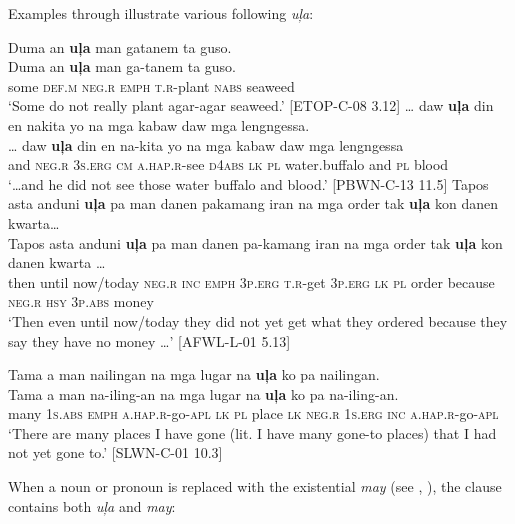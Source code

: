 Examples  through  illustrate various  following \textit{uļa}:

\ea
\label{bkm:Ref80941234}
Duma  an  \textbf{uļa}  man  gatanem  ta  guso. \\\smallskip
\gll Duma  an  \textbf{uļa}  man  ga-tanem  ta  guso. \\
some  \textsc{def.m}  \textsc{neg.r}  \textsc{emph}  \textsc{t.r}-plant  \textsc{nabs}  seaweed \\
\glt ‘Some do not really plant agar-agar seaweed.’ [ETOP-C-08 3.12]
\z
\ea
… daw  \textbf{uļa}  din  en  nakita  yo  na  mga  kabaw daw  mga  lengngessa. \\\smallskip
\gll … daw  \textbf{uļa}  din  en  na-kita  yo  na  mga  kabaw daw  mga  lengngessa \\
{} and  \textsc{neg.r}  3\textsc{s.erg}  \textsc{cm}  \textsc{a.hap.r}-see  \textsc{d4abs}  \textsc{lk}  \textsc{pl}  water.buffalo
and  \textsc{pl}  blood \\
\glt ‘…and he did not see those water buffalo and blood.’ [PBWN-C-13 11.5]
\z
\ea
Tapos  asta  anduni  \textbf{uļa}  pa  man  danen  pakamang  iran  na  mga  order tak  \textbf{uļa}  kon  danen   kwarta… \\\smallskip
\gll Tapos  asta  anduni  \textbf{uļa}  pa  man  danen  pa-kamang  iran  na  mga  order tak  \textbf{uļa}  kon  danen   kwarta … \\
then  until  now/today  \textsc{neg.r}  \textsc{inc}  \textsc{emph}  3\textsc{p.erg}  \textsc{t.r}-get  3\textsc{p.erg}  \textsc{lk}  \textsc{pl}  order
because  \textsc{neg.r}  \textsc{hsy}  3\textsc{p.abs}  money \\
\glt ‘Then even until now/today they did not yet get what they ordered because they say they have no money …’ [AFWL-L-01 5.13]
\z

\ea
Tama  a  man  nailingan  na  mga  lugar  na  \textbf{uļa}  ko  pa nailingan. \\\smallskip
\gll Tama  a  man  na-iling-an  na  mga  lugar  na  \textbf{uļa}  ko  pa na-iling-an. \\
many 1\textsc{s.abs}  \textsc{emph}  \textsc{a.hap.r}-go-\textsc{apl}  \textsc{lk}  \textsc{pl}  place  \textsc{lk}  \textsc{neg.r} 1\textsc{s.erg}  \textsc{inc} \textsc{a.hap.r-}go\textsc{-apl} \\
\glt ‘There are many places I have gone (lit. I have many gone-to places) that I had not yet gone to.’ [SLWN-C-01 10.3]
\z


When a noun or pronoun is replaced with the existential \textit{may} (see , ), the clause contains both \textit{uļa} and \textit{may}:

